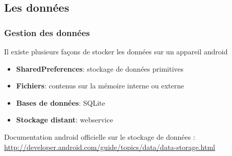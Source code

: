 \documentclass{beamer}
\begin{document}
\subsection{Les données}
\frametitle{Gestion des données}
\begin{frame}
Il existe plusieurs façons de stocker les données sur un appareil android
\begin{itemize}
    \item \textbf{SharedPreferences}: stockage de données primitives
    \item \textbf{Fichiers}: contenus sur la mémoire interne ou externe
    \item \textbf{Bases de données}: SQLite
    \item \textbf{Stockage distant}: webservice
\end{itemize}
Documentation android officielle sur le stockage de données : \url{http://developer.android.com/guide/topics/data/data-storage.html}
\end{frame}
\end{document}
